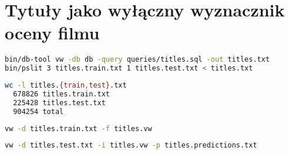 \documentclass{article}
\begin{document}
\section{Tytuły jako wyłączny wyznacznik oceny filmu}



\begin{lstlisting}[language=bash,caption=Przygotowanie danych dla modelu i ewaluacji,label=query1]
bin/db-tool vw -db db -query queries/titles.sql -out titles.txt
bin/pslit 3 titles.train.txt 1 titles.test.txt < titles.txt
\end{lstlisting}

\begin{lstlisting}[language=bash,caption=Wielkości zbiorów]
wc -l titles.{train,test}.txt
  678826 titles.train.txt
  225428 titles.test.txt
  904254 total
\end{lstlisting}

\begin{lstlisting}[language=bash, caption=Generowanie modelu]
vw -d titles.train.txt -f titles.vw
\end{lstlisting}

\begin{lstlisting}[language=bash, caption=Ewaluacja modelu]
vw -d titles.test.txt -i titles.vw -p titles.predictions.txt
\end{lstlisting}
\end{document}
